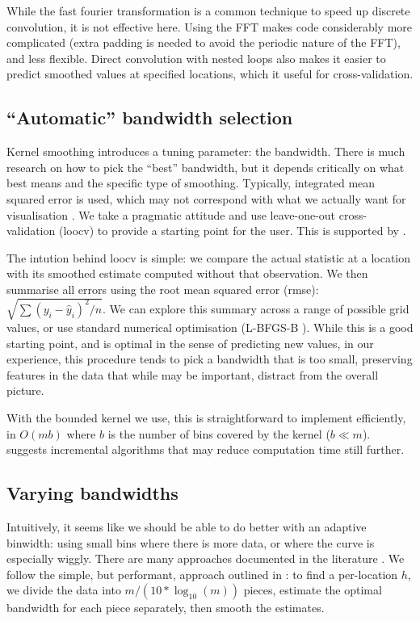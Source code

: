 \documentclass[journal]{vgtc}                %
\begin{document}
While the fast fourier transformation is a common technique to speed up discrete convolution, it is not effective here.  Using the FFT makes code considerably more complicated (extra padding is needed to avoid the periodic nature of the FFT), and less flexible. Direct convolution with nested loops also makes it easier to predict smoothed values at specified locations, which it useful for cross-validation.

\subsection{``Automatic'' bandwidth selection}

Kernel smoothing introduces a tuning parameter: the bandwidth. There is much research on how to pick the ``best'' bandwidth, but it depends critically on what best means and the specific type of smoothing. Typically, integrated mean squared error is used, which may not correspond with what we actually want for visualisation \citep{denby:2009}. We take a pragmatic attitude and use leave-one-out cross-validation (loocv) \citep{efron:1983} to provide a starting point for the user.  This is supported by \citep{loader:1999}.

The intution behind loocv is simple: we compare the actual statistic at a location with its smoothed estimate computed without that observation. We then summarise all errors using the root mean squared error (rmse): $\sqrt{ \sum (y_i - \hat{y}_i)^2 / n}$. We can explore this summary across a range of possible grid values, or use standard numerical optimisation (L-BFGS-B \citep{byrd:1995}). While this is a good starting point, and is optimal in the sense of predicting new values, in our experience, this procedure tends to pick a bandwidth that is too small, preserving features in the data that while may be important, distract from the overall picture.

With the bounded kernel we use, this is straightforward to implement efficiently, in $O(m b)$ where $b$ is the number of bins covered by the kernel ($b \ll m$). \citep{fan:1994} suggests incremental algorithms that may reduce computation time still further.

\subsection{Varying bandwidths}

Intuitively, it seems like we should be able to do better with an adaptive binwidth: using small bins where there is more data, or where the curve is especially wiggly. There are many approaches documented in the literature  \citep{terrell:1992, brockmann:1993,schucany:1995,herrmann:1997}. We follow the simple, but performant, approach outlined in \citep{fan:1995}: to find a per-location $h$, we divide the data into $m / (10 * \log_{10}(m))$ pieces, estimate the optimal bandwidth for each piece separately, then smooth the estimates.
\end{document}

